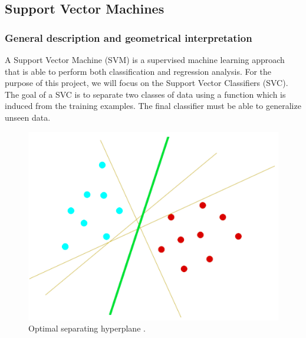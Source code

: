 \documentclass[nocrop]{bioinfo}
\begin{document}
\begin{methods}
\subsection{Support Vector Machines} 
\subsubsection{General description and geometrical interpretation}
A Support Vector Machine (SVM) is a supervised machine learning approach that is able to perform both classification and regression analysis. For the purpose of this project, we will focus on the Support Vector Classifiers (SVC).  The goal of a SVC is to separate two classes of data using a function which is induced from the training examples. The final classifier must be able to generalize unseen data. 
\begin{figure}[!tbh]%
\centering
\includegraphics[scale=0.25]{./plotsJPred4/SVM_1.png}
\vspace{-15pt}
\caption{Optimal separating hyperplane \citep{gunn1998support}.}\label{fig:06}
\end{figure}


\end{methods}
\end{document}
